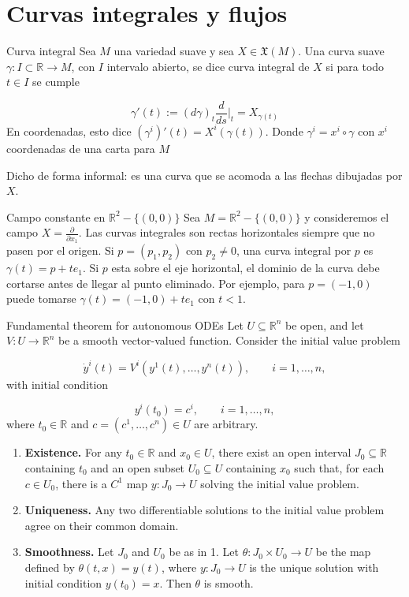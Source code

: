 \section{Curvas integrales y flujos}
\begin{bookdefinition}{Curva integral}
Sea $M$ una variedad suave y sea $X \in \mathfrak X(M)$. Una curva suave $\gamma:I \subset \mathbb R \to M$, con $I$ intervalo abierto, se dice curva integral de $X$ si para todo $t \in I$ se cumple

\[
\gamma'(t):=(d\gamma)_t\frac{d}{ds}|_t=X_{\gamma(t)}
\]
En coordenadas, esto dice $(\gamma^i)'(t)=X^i(\gamma(t))$. Donde $\gamma^{i}=x^{i}\circ \gamma$ con $x^{i}$ coordenadas de una carta para $M$

Dicho de forma informal: es una curva que se acomoda a las flechas dibujadas por $X$.

\end{bookdefinition}
\begin{bookexample}{Campo constante en $\mathbb R^2-\{(0,0)\}$}
Sea $M=\mathbb R^2-\{(0,0)\}$ y consideremos el campo $X=\frac{\partial}{\partial x_1}$. 
 Las curvas integrales son rectas horizontales siempre que no pasen por el origen. Si $p=(p_1,p_2)$ con $p_2 \neq 0$, una curva integral por $p$ es $\gamma(t)=p+te_1$. Si $p$ esta sobre el eje horizontal, el dominio de la curva debe cortarse antes de llegar al punto eliminado. Por ejemplo, para $p=(-1,0)$ puede tomarse $\gamma(t)=(-1,0)+te_1$ con $t<1$.

\end{bookexample}
\begin{booktheorem}{Fundamental theorem for autonomous ODEs}
Let $U\subseteq\mathbb R^n$ be open, and let $V:U\to\mathbb R^n$ be a smooth vector-valued function. Consider the initial value problem

\[
\dot y^i(t)=V^i(y^1(t),\ldots,y^n(t)),\qquad i=1,\ldots,n,
\]
with initial condition

\[
y^i(t_0)=c^i,\qquad i=1,\ldots,n,
\]
where $t_0\in\mathbb R$ and $c=(c^1,\ldots,c^n)\in U$ are arbitrary.

\begin{enumerate}
\item \textbf{Existence.} For any $t_0\in\mathbb R$ and $x_0\in U$, there exist an open interval $J_0\subseteq\mathbb R$ containing $t_0$ and an open subset $U_0\subseteq U$ containing $x_0$ such that, for each $c\in U_0$, there is a $C^1$ map $y:J_0\to U$ solving the initial value problem.
\item \textbf{Uniqueness.} Any two differentiable solutions to the initial value problem agree on their common domain.
\item \textbf{Smoothness.} Let $J_0$ and $U_0$ be as in 1. Let $\theta:J_0\times U_0\to U$ be the map defined by $\theta(t,x)=y(t)$, where $y:J_0\to U$ is the unique solution with initial condition $y(t_0)=x$. Then $\theta$ is smooth.
\end{enumerate}
\end{booktheorem}
\label{blk:81ef7e}
